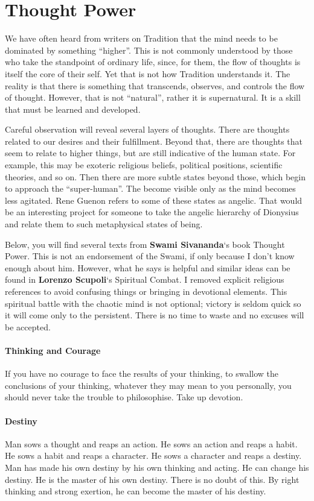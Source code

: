 \section{Thought Power}

We have often heard from writers on Tradition that the mind needs to be dominated by something “higher”. This is not commonly understood by those who take the standpoint of ordinary life, since, for them, the flow of thoughts is itself the core of their self. Yet that is not how Tradition understands it. The reality is that there is something that transcends, observes, and controls the flow of thought. However, that is not “natural”, rather it is supernatural. It is a skill that must be learned and developed.

Careful observation will reveal several layers of thoughts. There are thoughts related to our desires and their fulfillment. Beyond that, there are thoughts that seem to relate to higher things, but are still indicative of the human state. For example, this may be exoteric religious beliefs, political positions, scientific theories, and so on. Then there are more subtle states beyond those, which begin to approach the “super-human”. The become visible only as the mind becomes less agitated. Rene Guenon refers to some of these states as angelic. That would be an interesting project for someone to take the angelic hierarchy of Dionysius and relate them to such metaphysical states of being.

Below, you will find several texts from \textbf{Swami Sivananda}`s book Thought Power. This is not an endorsement of the Swami, if only because I don't know enough about him. However, what he says is helpful and similar ideas can be found in \textbf{Lorenzo Scupoli}`s Spiritual Combat. I removed explicit religious references to avoid confusing things or bringing in devotional elements. This spiritual battle with the chaotic mind is not optional; victory is seldom quick so it will come only to the persistent. There is no time to waste and no excuses will be accepted.

\paragraph{Thinking and Courage}
If you have no courage to face the results of your thinking, to swallow the conclusions of your thinking, whatever they may mean to you personally, you should never take the trouble to philosophise. Take up devotion.

\paragraph{Destiny}
Man sows a thought and reaps an action. He sows an action and reaps a habit. He sows a habit and reaps a character. He sows a character and reaps a destiny. Man has made his own destiny by his own thinking and acting. He can change his destiny. He is the master of his own destiny. There is no doubt of this. By right thinking and strong exertion, he can become the master of his destiny.

